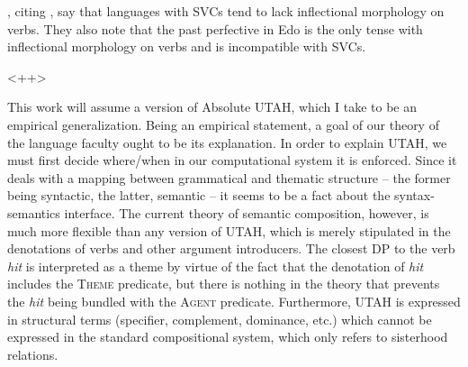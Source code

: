 \documentclass[letterpaper]{article}
\begin{document}
\textcite{bakerstewart1999double}, citing \textcite{dechaine1993diss}, say that languages with SVCs tend to lack inflectional morphology on verbs.
They also note that the past perfective in Edo is the only tense with inflectional morphology on verbs and is incompatible with SVCs.

<++>

This work will assume a version of  Absolute UTAH, which I take to be an empirical generalization.
Being an empirical statement, a goal of our theory of the language faculty ought to be its explanation.
In order to explain UTAH, we must first decide where/when in our computational system it is enforced.
Since it deals with a mapping between grammatical and thematic structure -- the former being syntactic, the latter, semantic -- it seems to be a fact about the syntax-semantics interface.
The current theory of semantic composition, however, is much more flexible than any version of UTAH, which is merely stipulated in the denotations of verbs and other argument introducers.
The closest DP to the verb \textit{hit} is interpreted as a theme by virtue of the fact that the denotation of \textit{hit} includes the \textsc{Theme} predicate, but there is nothing in the theory that prevents the \textit{hit} being bundled with the \textsc{Agent} predicate.
Furthermore, UTAH is expressed in structural terms (specifier, complement, dominance, etc.) which cannot be expressed in the standard compositional system, which only refers to sisterhood relations. 

\printbibliography
\end{document}

